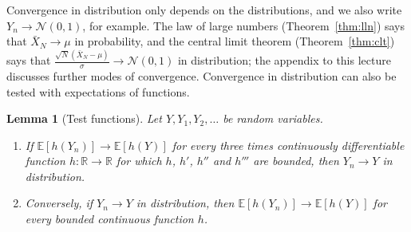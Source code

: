 \documentclass[11pt]{article}
\newcommand{\E}{\mathbb{E}}
\theoremstyle{definition}
\theoremstyle{plain}
\newtheorem{lemma}[definition]{Lemma}
\theoremstyle{remark}
\begin{document}
Convergence in distribution only depends on the distributions, and we also write $Y_n \to \mathcal{N}(0, 1)$, for example. The law of large numbers (Theorem~\ref{thm:lln}) says that $\bar X_N \to \mu$ in probability, and the central limit theorem (Theorem~\ref{thm:clt}) says that $\frac{\sqrt{N}(\bar X_N - \mu)}{\sigma} \to \mathcal{N}(0, 1)$ in distribution; the appendix to this lecture discusses further modes of convergence. Convergence in distribution can also be tested with expectations of functions.

\begin{lemma}[Test functions]\label{lem:test-functions}
    Let $Y, Y_1, Y_2, \ldots$ be random variables.
    \begin{enumerate}
        \item If $\E[h(Y_n)] \to \E[h(Y)]$ for every three times continuously differentiable function $h: \mathbb{R} \to \mathbb{R}$ for which $h$, $h'$, $h''$ and $h'''$ are bounded, then $Y_n \to Y$ in distribution.
        \item Conversely, if $Y_n \to Y$ in distribution, then $\E[h(Y_n)] \to \E[h(Y)]$ for every bounded continuous function $h$.
    \end{enumerate}
\end{lemma}
\end{document}
